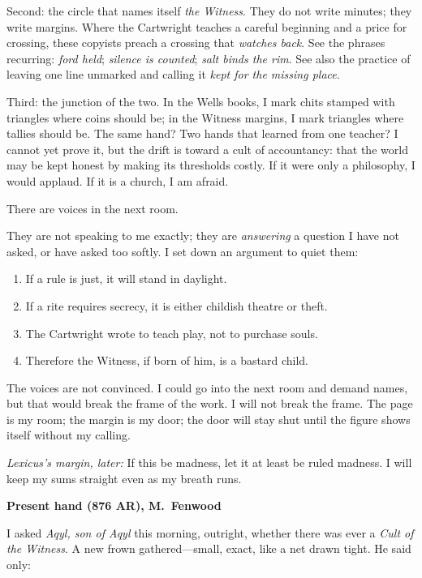 \documentclass[11pt]{article}
\begin{document}
Second: the circle that names itself \textit{the Witness}. They do not write minutes; they write margins. Where the Cartwright teaches a careful beginning and a price for crossing, these copyists preach a crossing that \emph{watches back}. See the phrases recurring: \emph{ford held}; \emph{silence is counted}; \emph{salt binds the rim}. See also the practice of leaving one line unmarked and calling it \emph{kept for the missing place}.

Third: the junction of the two. In the Wells books, I mark chits stamped with triangles where coins should be; in the Witness margins, I mark triangles where tallies should be. The same hand? Two hands that learned from one teacher? I cannot yet prove it, but the drift is toward a cult of accountancy: that the world may be kept honest by making its thresholds costly. If it were only a philosophy, I would applaud. If it is a church, I am afraid.

There are voices in the next room.

They are not speaking to me exactly; they are \emph{answering} a question I have not asked, or have asked too softly. I set down an argument to quiet them:

\begin{enumerate}\setlength\itemsep{0.25em}
  \item If a rule is just, it will stand in daylight.
  \item If a rite requires secrecy, it is either childish theatre or theft.
  \item The Cartwright wrote to teach play, not to purchase souls.
  \item Therefore the Witness, if born of him, is a bastard child.
\end{enumerate}

The voices are not convinced. I could go into the next room and demand names, but that would break the frame of the work. I will not break the frame. The page is my room; the margin is my door; the door will stay shut until the figure shows itself without my calling.

\medskip
\noindent\textit{Lexicus’s margin, later:} If this be madness, let it at least be ruled madness. I will keep my sums straight even as my breath runs.

\medskip
\noindent\textbf{Present hand (876 AR), M.\ Fenwood}

I asked \textit{Aqyl, son of Aqyl} this morning, outright, whether there was ever a \emph{Cult of the Witness}. A new frown gathered—small, exact, like a net drawn tight. He said only:
\end{document}
